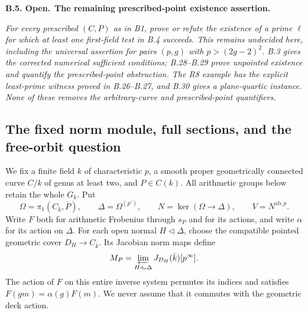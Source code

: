 \documentclass[11pt,a4paper]{article}
\newenvironment{claim}[3]{\par\medskip\noindent\hypertarget{#1}{\textbf{#1. #2.}}\ \textbf{#3.}\par\nopagebreak\smallskip\begingroup\itshape}{\endgroup\par\smallskip}
\begin{document}
\begin{claim}{B.5}{Open}{The remaining prescribed-point existence assertion}
For every prescribed $(C,P)$ as in B1, prove or refute the
existence of a prime $\ell$ for which at least one first-field
test in B.4 succeeds. This remains undecided here, including
the universal assertion for pairs $(p,g)$ with
$p>(2g-2)^2$. B.3 gives the corrected numerical sufficient
conditions; B.28--B.29 prove unpointed existence and quantify
the prescribed-point obstruction. The R8 example has the
explicit least-prime witness proved in B.26--B.27, and B.30
gives a plane-quartic instance. None of these removes the
arbitrary-curve and prescribed-point quantifiers.
\end{claim}


\subsection{The fixed norm module, full sections, and the free-orbit question}

We fix a finite field $k$ of characteristic $p$, a smooth proper
geometrically connected curve $C/k$ of genus at least two, and
$P\in C(k)$. All arithmetic groups below retain the whole $G_k$.
Put
\[
 \Omega=\pi_1(C_{\bar k},\bar P),\qquad
 \Delta=\Omega^{(p')},\qquad
 N=\ker(\Omega\longrightarrow\Delta),\qquad
 V=N^{\mathrm{ab},p}.
\]
Write $F$ both for arithmetic Frobenius through $s_P$ and for its
actions, and write $\alpha$ for its action on $\Delta$. For each
open normal $H\triangleleft\Delta$, choose the compatible pointed
geometric cover $D_H\to C_{\bar k}$. Its Jacobian norm maps define
\[
 M_P=\varprojlim_{H\triangleleft_o\Delta}
                 J_{D_H}(\bar k)[p^\infty].
\]
The action of $F$ on this entire inverse system permutes its
indices and satisfies $F(gm)=\alpha(g)F(m)$. We never assume that
it commutes with the geometric deck action.
\end{document}
